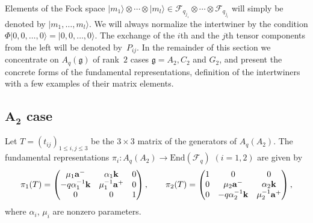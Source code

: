 \documentclass[pdftex]{sigma}
\begin{document}
Elements of the Fock space
$|m_1\rangle \otimes \cdots \otimes |m_l\rangle
\in \mathcal{F}_{q_{j_1}}\otimes \cdots \otimes \mathcal{F}_{q_{j_l}}$
will simply be denoted by
$|m_1, \ldots, m_l\rangle$.
We will always normalize the intertwiner by the condition
$\Phi |0,0,\ldots, 0\rangle =  |0,0,\ldots, 0\rangle$.
The exchange of the $i$th and the $j$th tensor components from the left
will be denoted by~$P_{ij}$.
In the remainder of this section we concentrate on
$A_q(\mathfrak{g})$ of rank~$2$ cases
$\mathfrak{g}=A_2, C_2$ and $G_2$,
and present the concrete forms of the
fundamental representations,
def\/inition of the intertwiners with
a few examples of their matrix elements.

\subsection[$A_2$ case]{$\boldsymbol{A_2}$ case}\label{a:ss:a2}

Let $T=(t_{ij})_{1\le i,j \le 3}$ be the
$3\times 3$ matrix of the generators of $A_q(A_2)$.
The fundamental representations
$\pi_i: A_q(A_2) \rightarrow \mathrm{End}(\mathcal{F}_q)$
$(i=1,2)$ are given by
\begin{gather}\label{a:piTa}
\pi_1(T) =
\begin{pmatrix}
\mu_1{\rm {\bf a}}^- &  \alpha_1{\rm {\bf k}} & 0 \\
-q\alpha^{-1}_1{\rm {\bf k}} & \mu^{-1}_1{\rm {\bf a}}^+ & 0\\
0 & 0 & 1
\end{pmatrix},
\qquad
\pi_2(T) =
\begin{pmatrix}
1 & 0 & 0\\
0 & \mu_2{\rm {\bf a}}^- &  \alpha_2{\rm {\bf k}}\\
0 & -q\alpha^{-1}_2{\rm {\bf k}} & \mu^{-1}_2{\rm {\bf a}}^+
\end{pmatrix},
\end{gather}
where $\alpha_i$, $\mu_i$ are nonzero parameters.
\end{document}
